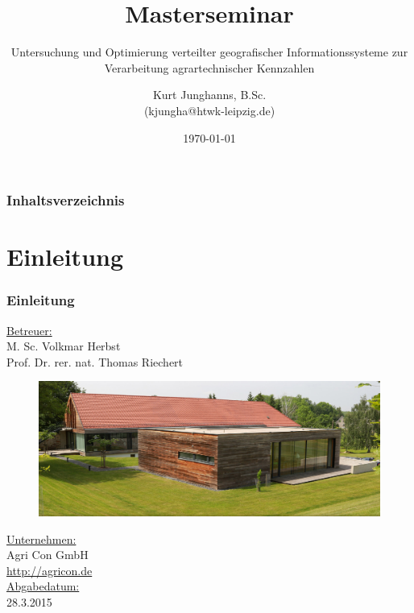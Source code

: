 \documentclass{beamer}
\begin{document}
\title{Masterseminar}
\subtitle{Untersuchung und Optimierung verteilter geografischer Informationssysteme zur Verarbeitung agrartechnischer Kennzahlen} 
\author{Kurt Junghanns, B.Sc. \\(kjungha@htwk-leipzig.de)} 
\date{\today}
 
\begin{frame}
\titlepage
\end{frame}

\begin{frame}
\frametitle{Inhaltsverzeichnis}\tableofcontents
\end{frame}

\section{Einleitung}
\begin{frame}\frametitle{Einleitung}
\underline{Betreuer:}\\
M. Sc. Volkmar Herbst\\
Prof. Dr. rer. nat. Thomas Riechert\\
\vspace{\baselineskip}
\begin{figure}\centering
    \includegraphics[scale=0.21]{Firma.png}
\end{figure}
\underline{Unternehmen:}\\
Agri Con GmbH\\\url{http://agricon.de}\\
\vspace{\baselineskip}
\underline{Abgabedatum:}\\
28.3.2015
\end{frame}
\end{document}
